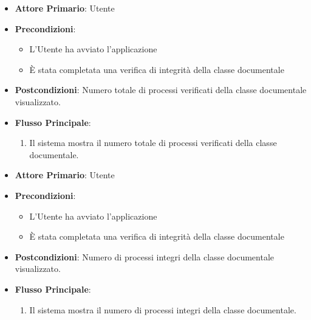 \begin{itemize}
    \item \textbf{Attore Primario}: Utente
    \item \textbf{Precondizioni}: 
        \begin{itemize}
            \item L'Utente ha avviato l'applicazione
            \item È stata completata una verifica di integrità della classe documentale
        \end{itemize} 
    \item \textbf{Postcondizioni}: Numero totale di processi verificati della classe documentale visualizzato.     
    \item \textbf{Flusso Principale}:
        \begin{enumerate}
            \item Il sistema mostra il numero totale di processi verificati della classe documentale.
        \end{enumerate}
\end{itemize}

\begin{itemize}
    \item \textbf{Attore Primario}: Utente
    \item \textbf{Precondizioni}: 
        \begin{itemize}
            \item L'Utente ha avviato l'applicazione
            \item È stata completata una verifica di integrità della classe documentale
        \end{itemize} 
    \item \textbf{Postcondizioni}: Numero di processi integri della classe documentale visualizzato.     
    \item \textbf{Flusso Principale}:
        \begin{enumerate}
            \item Il sistema mostra il numero di processi integri della classe documentale.
        \end{enumerate}
\end{itemize}

